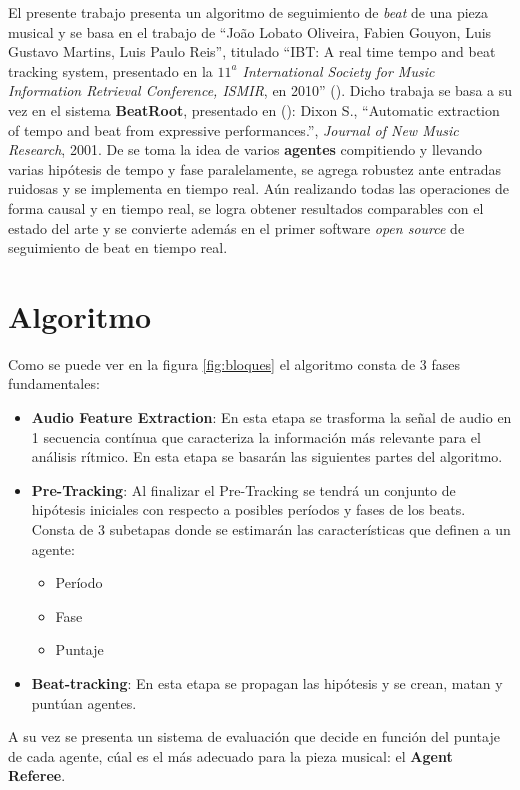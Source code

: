 \documentclass[12pt,a4paper,titlepage]{report}
\begin{document}
El presente trabajo presenta un algoritmo de seguimiento de \emph{beat} de una pieza musical y se basa en el trabajo de ``Jo\~ao Lobato Oliveira, Fabien Gouyon, Luis Gustavo Martins, Luis Paulo Reis'', titulado ``IBT: A real time tempo and beat tracking system, presentado en la \emph{$11^a$ International Society for Music Information Retrieval Conference, ISMIR}, en 2010'' (\cite{bib:el_posta}). Dicho trabaja se basa a su vez en el sistema \textbf{BeatRoot}, presentado en (\cite{bib:dixon}): Dixon S., ``Automatic extraction of tempo and beat from expressive performances.'', \emph{Journal of New Music Research}, 2001. De \cite{bib:dixon} se toma la idea de varios \textbf{agentes} compitiendo y llevando varias hipótesis de tempo y fase paralelamente, se agrega robustez ante entradas ruidosas y se implementa en tiempo real. Aún realizando todas las operaciones de forma causal y en tiempo real, se logra obtener resultados comparables con el estado del arte y se convierte además en el primer software \emph{open source} de seguimiento de beat en tiempo real.


\chapter*{Algoritmo}

Como se puede ver en la figura \ref{fig:bloques} el algoritmo consta de 3 fases fundamentales:
\begin{itemize}
\item \textbf{Audio Feature Extraction}: En esta etapa se trasforma la señal de audio en 1 secuencia contínua que caracteriza la información más relevante para el análisis rítmico. En esta etapa se basarán las siguientes partes del algoritmo.
\item \textbf{Pre-Tracking}: Al finalizar el Pre-Tracking se tendrá un conjunto de hipótesis iniciales con respecto a posibles períodos y fases de los beats. Consta de 3 subetapas donde se estimarán las características que definen a un agente:
\begin{itemize}
\item Período
\item Fase
\item Puntaje
\end{itemize}
\item \textbf{Beat-tracking}: En esta etapa se propagan las hipótesis y se crean, matan y puntúan agentes.
\end{itemize}

A su vez se presenta un sistema de evaluación que decide en función del puntaje de cada agente, cúal es el más adecuado para la pieza musical: el \textbf{Agent Referee}.
\end{document}

